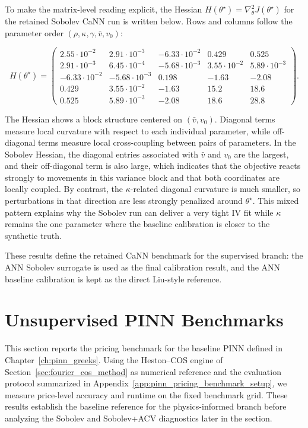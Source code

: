To make the matrix-level reading explicit, the Hessian \(H(\theta^\star)=\nabla_\theta^2J(\theta^\star)\) for the retained Sobolev CaNN run is written below. Rows and columns follow the parameter order \((\rho,\kappa,\gamma,\bar v,v_0)\):

\[
H(\theta^\star)=
\begin{pmatrix}
2.55\cdot10^{-2} & 2.91\cdot10^{-3} & -6.33\cdot10^{-2} & 0.429 & 0.525 \\
2.91\cdot10^{-3} & 6.45\cdot10^{-4} & -5.68\cdot10^{-3} & 3.55\cdot10^{-2} & 5.89\cdot10^{-3} \\
-6.33\cdot10^{-2} & -5.68\cdot10^{-3} & 0.198 & -1.63 & -2.08 \\
0.429 & 3.55\cdot10^{-2} & -1.63 & 15.2 & 18.6 \\
0.525 & 5.89\cdot10^{-3} & -2.08 & 18.6 & 28.8
\end{pmatrix}.
\]

The Hessian shows a block structure centered on \((\bar v,v_0)\). Diagonal terms measure local curvature with respect to each individual parameter, while off-diagonal terms measure local cross-coupling between pairs of parameters. In the Sobolev Hessian, the diagonal entries associated with \(\bar v\) and \(v_0\) are the largest, and their off-diagonal term is also large, which indicates that the objective reacts strongly to movements in this variance block and that both coordinates are locally coupled. By contrast, the \(\kappa\)-related diagonal curvature is much smaller, so perturbations in that direction are less strongly penalized around \(\theta^\star\). This mixed pattern explains why the Sobolev run can deliver a very tight IV fit while \(\kappa\) remains the one parameter where the baseline calibration is closer to the synthetic truth.

These results define the retained CaNN benchmark for the supervised branch: the ANN Sobolev surrogate is used as the final calibration result, and the ANN baseline calibration is kept as the direct Liu-style reference.

\section{Unsupervised PINN Benchmarks}
\label{sec:pinn_pricing_performance}
This section reports the pricing benchmark for the baseline PINN defined in Chapter~\ref{ch:pinn_greeks}. Using the Heston--COS engine of Section~\ref{sec:fourier_cos_method} as numerical reference and the evaluation protocol summarized in Appendix~\ref{app:pinn_pricing_benchmark_setup}, we measure price-level accuracy and runtime on the fixed benchmark grid. These results establish the baseline reference for the physics-informed branch before analyzing the Sobolev and Sobolev+ACV diagnostics later in the section.

